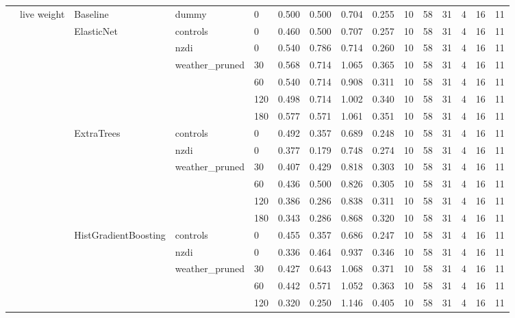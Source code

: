 \begin{longtable}{lllllrrrrrrrrrr}
\cline{2-15} \cline{3-15} \cline{4-15}
 & \multirow[t]{31}{*}{live weight} & Baseline & dummy & 0 & 0.500 & 0.500 & 0.704 & 0.255 & 10 & 58 & 31 & 4 & 16 & 11 \\
\cline{3-15} \cline{4-15}
 &  & \multirow[t]{6}{*}{ElasticNet} & controls & 0 & 0.460 & 0.500 & 0.707 & 0.257 & 10 & 58 & 31 & 4 & 16 & 11 \\
\cline{4-15}
 &  &  & nzdi & 0 & 0.540 & 0.786 & 0.714 & 0.260 & 10 & 58 & 31 & 4 & 16 & 11 \\
\cline{4-15}
 &  &  & \multirow[t]{4}{*}{weather_pruned} & 30 & 0.568 & 0.714 & 1.065 & 0.365 & 10 & 58 & 31 & 4 & 16 & 11 \\
 &  &  &  & 60 & 0.540 & 0.714 & 0.908 & 0.311 & 10 & 58 & 31 & 4 & 16 & 11 \\
 &  &  &  & 120 & 0.498 & 0.714 & 1.002 & 0.340 & 10 & 58 & 31 & 4 & 16 & 11 \\
 &  &  &  & 180 & 0.577 & 0.571 & 1.061 & 0.351 & 10 & 58 & 31 & 4 & 16 & 11 \\
\cline{3-15} \cline{4-15}
 &  & \multirow[t]{6}{*}{ExtraTrees} & controls & 0 & 0.492 & 0.357 & 0.689 & 0.248 & 10 & 58 & 31 & 4 & 16 & 11 \\
\cline{4-15}
 &  &  & nzdi & 0 & 0.377 & 0.179 & 0.748 & 0.274 & 10 & 58 & 31 & 4 & 16 & 11 \\
\cline{4-15}
 &  &  & \multirow[t]{4}{*}{weather_pruned} & 30 & 0.407 & 0.429 & 0.818 & 0.303 & 10 & 58 & 31 & 4 & 16 & 11 \\
 &  &  &  & 60 & 0.436 & 0.500 & 0.826 & 0.305 & 10 & 58 & 31 & 4 & 16 & 11 \\
 &  &  &  & 120 & 0.386 & 0.286 & 0.838 & 0.311 & 10 & 58 & 31 & 4 & 16 & 11 \\
 &  &  &  & 180 & 0.343 & 0.286 & 0.868 & 0.320 & 10 & 58 & 31 & 4 & 16 & 11 \\
\cline{3-15} \cline{4-15}
 &  & \multirow[t]{6}{*}{HistGradientBoosting} & controls & 0 & 0.455 & 0.357 & 0.686 & 0.247 & 10 & 58 & 31 & 4 & 16 & 11 \\
\cline{4-15}
 &  &  & nzdi & 0 & 0.336 & 0.464 & 0.937 & 0.346 & 10 & 58 & 31 & 4 & 16 & 11 \\
\cline{4-15}
 &  &  & \multirow[t]{4}{*}{weather_pruned} & 30 & 0.427 & 0.643 & 1.068 & 0.371 & 10 & 58 & 31 & 4 & 16 & 11 \\
 &  &  &  & 60 & 0.442 & 0.571 & 1.052 & 0.363 & 10 & 58 & 31 & 4 & 16 & 11 \\
 &  &  &  & 120 & 0.320 & 0.250 & 1.146 & 0.405 & 10 & 58 & 31 & 4 & 16 & 11 \\

\end{longtable}
